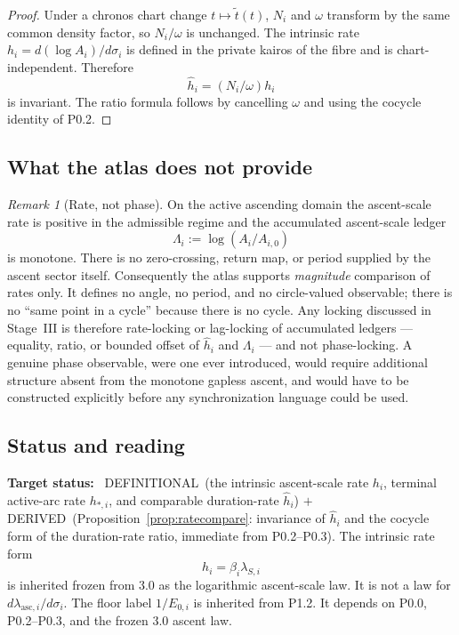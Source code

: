 \documentclass[11pt,a4paper]{article}
\newcommand{\stDerived}{\textcolor{cDer}{\textsf{\small DERIVED}}}
\newcommand{\stDef}{\textcolor{cDef}{\textsf{\small DEFINITIONAL}}}
\theoremstyle{definition}
\theoremstyle{plain}
\theoremstyle{remark}
\newtheorem{remark}[definition]{Remark}
\begin{document}
\begin{proof}
Under a chronos chart change \(t\mapsto\widetilde t(t)\), \(N_i\) and \(\omega\)
transform by the same common density factor, so \(N_i/\omega\) is unchanged.
The intrinsic rate \(h_i=d(\log A_i)/d\sigma_i\) is defined in the private kairos
of the fibre and is chart-independent. Therefore
\[
\hat h_i=(N_i/\omega)h_i
\]
is invariant. The ratio formula follows by cancelling \(\omega\) and using the
cocycle identity of P0.2. \qedhere
\end{proof}

\subsection{What the atlas does not provide}

\begin{remark}[Rate, not phase]\label{rem:noPhase}
On the active ascending domain the ascent-scale rate is positive in the
admissible regime and the accumulated ascent-scale ledger
\[
\Lambda_i:=\log(A_i/A_{i,0})
\]
is monotone. There is no zero-crossing, return map, or period supplied by the
ascent sector itself. Consequently the
atlas supports \emph{magnitude} comparison of rates only. It defines no angle, no period,
and no circle-valued observable; there is no ``same point in a cycle'' because there is no
cycle. Any locking discussed in Stage~III is therefore rate-locking or lag-locking of
accumulated ledgers --- equality, ratio, or bounded offset of \(\hat h_i\) and
\(\Lambda_i\) --- and not phase-locking. A genuine phase observable, were one
ever introduced, would require additional structure absent from the monotone gapless
ascent, and would have to be constructed explicitly before any synchronization language
could be used.
\end{remark}

\subsection{Status and reading}

\textbf{Target status:}~
\stDef\ (the intrinsic ascent-scale rate \(h_i\), terminal active-arc rate
\(h_{*,i}\), and comparable duration-rate \(\hat h_i\)) \(+\) \stDerived\
(Proposition~\ref{prop:ratecompare}: invariance of \(\hat h_i\) and the cocycle
form of the duration-rate ratio, immediate from P0.2--P0.3). The intrinsic rate
form
\[
h_i=\beta_i\lambda_{S,i}
\]
is inherited frozen from 3.0 as the logarithmic ascent-scale law. It is not a law
for \(d\lambda_{\mathrm{asc},i}/d\sigma_i\). The floor label \(1/E_{0,i}\) is
inherited from P1.2. It depends on P0.0, P0.2--P0.3, and the frozen 3.0
ascent law.
\end{document}
